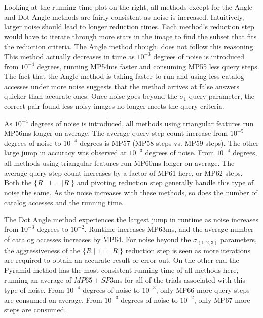 Looking at the running time plot on the right, all methods except for the Angle and Dot Angle methods are fairly
consistent as noise is increased.
Intuitively, larger noise should lead to longer reduction times.
Each method's reduction step would have to iterate through more stars in the image to find the subset that fits the
reduction criteria.
The Angle method though, does not follow this reasoning.
This method actually decreases in time as $10^{-3}$ degrees of noise is introduced from $10^{-4}$ degrees, running
MP54ms faster and consuming MP55 less query steps.
The fact that the Angle method is taking faster to run and using less catalog accesses under more noise suggests that
the method arrives at false answers quicker than accurate ones.
Once noise goes beyond the $\sigma_1$ query parameter, the correct pair found less noisy images no longer meets the
query criteria.

As $10^{-4}$ degrees of noise is introduced, all methods using triangular features run MP56ms longer on average.
The average query step count increase from $10^{-5}$ degrees of noise to $10^{-4}$ degrees is MP57 (MP58 steps vs.
MP59 steps).
The other large jump in accuracy was observed at $10^{-3}$ degrees of noise.
From $10^{-4}$ degrees, all methods using triangular features run MP60ms longer on average.
The average query step count increases by a factor of MP61 here, or MP62 steps.
Both the $\{ R \mid 1 = |R| \}$ and pivoting reduction step generally handle this type of noise the same.
As the noise increases with these methods, so does the number of catalog accesses and the running time.

The Dot Angle method experiences the largest jump in runtime as noise increases from $10^{-3}$ degrees to $10^{-2}$.
Runtime increases MP63ms, and the average number of catalog accesses increases by MP64.
For noise beyond the $\sigma_{(1, 2, 3)}$ parameters, the aggressiveness of the $\{ R \mid 1 = |R| \}$ reduction step
is seen as more iterations are required to obtain an accurate result or error out.
On the other end the Pyramid method has the most consistent running time of all methods here, running an average of
$MP65 \pm SP3$ms for all of the trials associated with this type of noise.
From $10^{-4}$ degrees of noise to $10^{-3}$, only MP66 more query steps are consumed on average.
From $10^{-3}$ degrees of noise to $10^{-2}$, only MP67 more steps are consumed.

